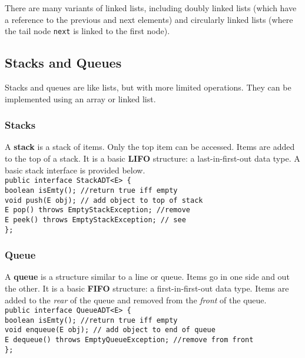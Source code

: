 There are many variants of linked lists, including doubly linked lists (which have a reference to the previous and next elements) and circularly linked lists (where the tail node \texttt{next} is linked to the first node). 

\subsection{Stacks and Queues}

Stacks and queues are like lists, but with more limited operations. They can be implemented using an array or linked list. 

\subsubsection{Stacks}

A \textbf{stack} is a stack of items. Only the top item can be accessed. Items are added to the top of a stack. It is a basic \textbf{LIFO} structure: a last-in-first-out data type. A basic stack interface is provided below. \\

\texttt{public interface StackADT<E> \{} \\
\indent \indent \texttt{boolean isEmty(); //return true iff empty} \\
\indent \indent \texttt{void push(E obj); // add object to top of stack} \\
\indent \indent \texttt{E pop() throws EmptyStackException; //remove} \\
\indent \indent \texttt{E peek() throws EmptyStackException; // see} \\
\indent \texttt{\};} \\

\subsubsection{Queue}

A \textbf{queue} is a structure similar to a line or queue. Items go in one side and out the other. It is a basic \textbf{FIFO} structure: a first-in-first-out data type. Items are added to the \textit{rear} of the queue and removed from the \textit{front} of the queue. \\

\texttt{public interface QueueADT<E> \{} \\
\indent \indent \texttt{boolean isEmty(); //return true iff empty} \\
\indent \indent \texttt{void enqueue(E obj); // add object to end of queue} \\
\indent \indent \texttt{E dequeue() throws EmptyQueueException; //remove from front} \\
\indent \texttt{\};} \\

